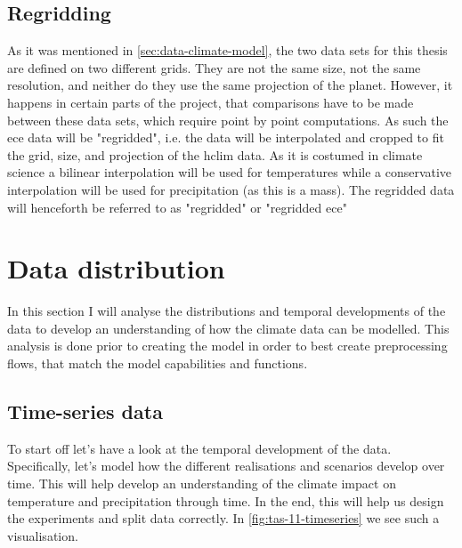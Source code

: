 \subsection{Regridding} \label{sec:regridding}

As it was mentioned in \autoref{sec:data-climate-model}, the two data sets for this thesis are defined on two different grids. They are not the same size, not the same resolution, and neither do they use the same projection of the planet.
However, it happens in certain parts of the project, that comparisons have to be made between these data sets, which require point by point computations. As such the \gls{ece} data will be "regridded", i.e. the data will be interpolated and cropped to fit the grid, size, and projection of the \gls{hclim} data. As it is costumed in climate science a bilinear interpolation will be used for temperatures while a conservative interpolation will be used for precipitation (as this is a mass). The regridded data will henceforth be referred to as "regridded" or "regridded \gls{ece}"

\section{Data distribution} \label{sec:data-distribution}
In this section I will analyse the distributions and temporal developments of the data to develop an understanding of how the climate data can be modelled. This analysis is done prior to creating the model in order to best create preprocessing flows, that match the model capabilities and functions.

\subsection{Time-series data}
To start off let's have a look at the temporal development of the data. Specifically, let's model how the different \glspl{realisation} and \glspl{scenario} develop over time. This will help develop an understanding of the climate impact on temperature and precipitation through time. In the end, this will help us design the experiments and split data correctly. In \autoref{fig:tas-11-timeseries} we see such a visualisation.

